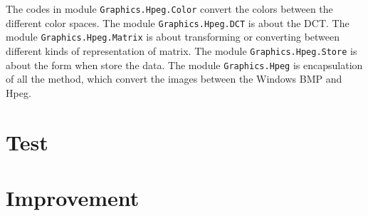 \documentclass{article}
\begin{document}
The codes in module \verb|Graphics.Hpeg.Color| convert the colors between the different color spaces.
The module \verb|Graphics.Hpeg.DCT| is about the DCT.
The module \verb|Graphics.Hpeg.Matrix| is about transforming or converting between different kinds of representation of matrix.
The module \verb|Graphics.Hpeg.Store| is about the form when store the data.
The module \verb|Graphics.Hpeg| is encapsulation of all the method, which convert the images between the Windows BMP and Hpeg.







\section{Test}
\label{sec:test}












\section{Improvement}
\label{sec:improvement}
\end{document}
